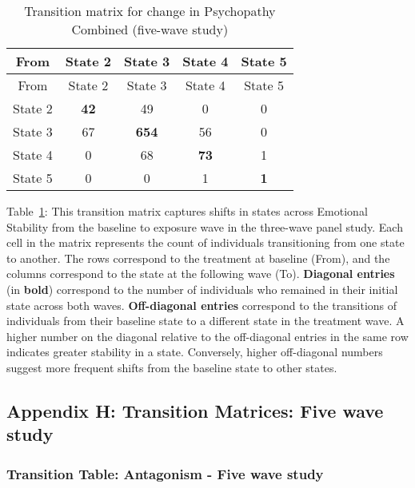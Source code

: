 \documentclass[
  single column]{article}
\begin{document}
\begin{longtable}[]{@{}ccccc@{}}
\caption{Transition matrix for change in Psychopathy Combined (five-wave
study)}\label{tbl-table-transition-psychopathy-combined}\tabularnewline
\toprule\noalign{}
From & State 2 & State 3 & State 4 & State 5 \\
\midrule\noalign{}
\endfirsthead
\toprule\noalign{}
From & State 2 & State 3 & State 4 & State 5 \\
\midrule\noalign{}
\endhead
\bottomrule\noalign{}
\endlastfoot
State 2 & \textbf{42} & 49 & 0 & 0 \\
State 3 & 67 & \textbf{654} & 56 & 0 \\
State 4 & 0 & 68 & \textbf{73} & 1 \\
State 5 & 0 & 0 & 1 & \textbf{1} \\
\end{longtable}

Table~\ref{tbl-table-transition-psychopathy-combined}: This transition
matrix captures shifts in states across Emotional Stability from the
baseline to exposure wave in the three-wave panel study. Each cell in
the matrix represents the count of individuals transitioning from one
state to another. The rows correspond to the treatment at baseline
(From), and the columns correspond to the state at the following wave
(To). \textbf{Diagonal entries} (in \textbf{bold}) correspond to the
number of individuals who remained in their initial state across both
waves. \textbf{Off-diagonal entries} correspond to the transitions of
individuals from their baseline state to a different state in the
treatment wave. A higher number on the diagonal relative to the
off-diagonal entries in the same row indicates greater stability in a
state. Conversely, higher off-diagonal numbers suggest more frequent
shifts from the baseline state to other states.

\subsection{Appendix H: Transition Matrices: Five wave
study}\label{appendix-h-transition-matrices-five-wave-study}

\subsubsection{Transition Table: Antagonism - Five wave
study}\label{transition-table-antagonism---five-wave-study}
\end{document}

